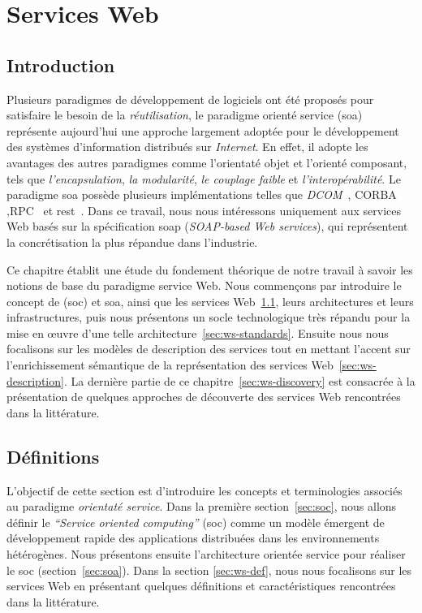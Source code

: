 \chapter{Services Web}
\label{ch:web-service}

\section*{Introduction}
 

Plusieurs paradigmes de développement de logiciels ont été proposés
pour satisfaire le besoin de la \textit{réutilisation}, le paradigme
orienté service (\acrshort{soa}) représente aujourd'hui une approche
largement adoptée pour le développement des systèmes d'information
distribués sur \textit{Internet}. En effet, il adopte les avantages
des autres paradigmes comme l'orientaté objet et l'orienté composant,
tels que \textit{l'encapsulation}, \textit{la modularité}, \textit{le
  couplage faible} et \textit{l'interopérabilité}. Le paradigme
\acrshort{soa} possède plusieurs implémentations telles que
\textit{DCOM}~\cite{frank1997dcom}, \textsc{CORBA}
\cite{vinoski1997corba},\textsc{RPC}~\cite{bloomer1992power} et
\acrshort{rest}~\cite{fielding2000architectural}. Dans ce travail,
nous nous intéressons uniquement aux services Web basés sur la
spécification \acrshort{soap} (\textit{SOAP-based Web services}), qui
représentent la concrétisation la plus répandue dans
l'industrie.\bigskip

Ce chapitre établit une étude du fondement théorique de notre travail
à savoir les notions de base du paradigme service Web. Nous commençons
par introduire le concept de (\acrshort{soc}) et \acrshort{soa}, ainsi
que les services Web~\ref{sec:ws-definitions}, leurs architectures et
leurs infrastructures, puis nous présentons un socle technologique
très répandu pour la mise en œuvre d'une telle
architecture~\ref{sec:ws-standards}. Ensuite nous nous focalisons sur
les modèles de description des services tout en mettant l'accent sur
l'enrichissement sémantique de la représentation des services
Web~\ref{sec:ws-description}. La dernière partie de ce
chapitre~\ref{sec:ws-discovery} est consacrée à la présentation de
quelques approches de découverte des services Web rencontrées dans la
littérature.

\newpage
\section{Définitions}
\label{sec:ws-definitions}
L'objectif de cette section est d'introduire les concepts et
terminologies associés au paradigme \textit{orientaté service}. Dans
la première section~\ref{sec:soc}, nous allons définir le
\textit{``Service oriented computing''} (\acrshort{soc}) comme un
modèle émergent de développement rapide des applications distribuées
dans les environnements hétérogènes. Nous présentons ensuite
l'architecture orientée service pour réaliser le \acrshort{soc}
(section~\ref{sec:soa}). Dans la section \ref{sec:ws-def}, nous nous
focalisons sur les services Web en présentant quelques définitions et
caractéristiques rencontrées dans la littérature.

